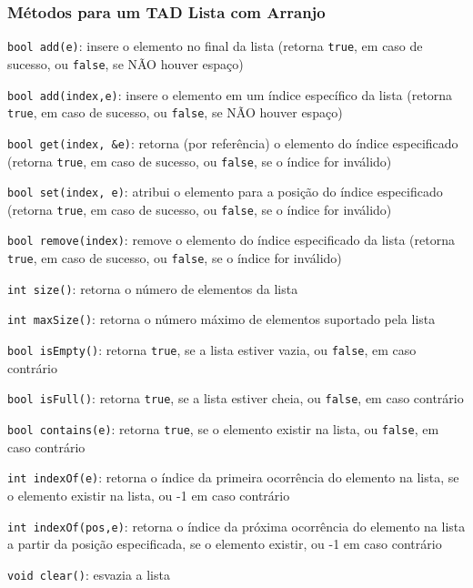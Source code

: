 \documentclass[aspectratio=169]{beamer}
\begin{document}
\begin{frame}\frametitle{Métodos para um TAD Lista com Arranjo}
\begin{itemize}
{\scriptsize
	\item \texttt{bool add(e)}: insere o elemento no final da lista (retorna \texttt{true}, em caso de sucesso, ou \texttt{false}, se NÃO houver espaço)
	\item \texttt{bool add(index,e)}: insere o elemento em um índice específico da lista (retorna \texttt{true}, em caso de sucesso, ou \texttt{false}, se NÃO houver espaço)
	\item \texttt{bool get(index, \&e)}: retorna (por referência) o elemento do índice especificado (retorna \texttt{true}, em caso de sucesso, ou \texttt{false}, se o índice for inválido)
	\item \texttt{bool set(index, e)}: atribui o elemento para a posição do índice especificado (retorna \texttt{true}, em caso de sucesso, ou \texttt{false}, se o índice for inválido)
	\item \texttt{bool remove(index)}: remove o elemento do índice especificado da lista (retorna \texttt{true}, em caso de sucesso, ou \texttt{false}, se o índice for inválido)
	\item \texttt{int size()}: retorna o número de elementos da lista\\
	\item \texttt{int maxSize()}: retorna o número máximo de elementos suportado pela lista\\
	\item \texttt{bool isEmpty()}: retorna \texttt{true}, se a lista estiver vazia, ou \texttt{false}, em caso contrário\\
	\item \texttt{bool isFull()}: retorna \texttt{true}, se a lista estiver cheia, ou \texttt{false}, em caso contrário\\
	\item \texttt{bool contains(e)}: retorna \texttt{true}, se o elemento existir na lista, ou \texttt{false},  em caso contrário\\
	\item \texttt{int indexOf(e)}: retorna o índice da primeira ocorrência do elemento na lista, se o elemento existir na lista, ou -1 em caso contrário\\
	\item \texttt{int indexOf(pos,e)}: retorna o índice da próxima ocorrência do elemento na lista a partir da posição especificada, se o elemento existir, ou -1 em caso contrário\\
	\item \texttt{void clear()}: esvazia a lista\\
}
\end{itemize}
\end{frame}
\end{document}
